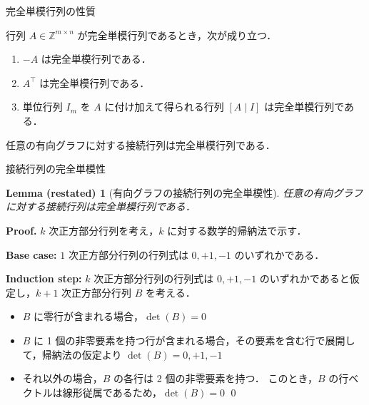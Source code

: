 \documentclass[aspectratio=169]{beamer}
\newtheorem*{lemma*}{Lemma (restated)}
\begin{document}
\begin{frame}{完全単模行列の性質}
	\begin{lemma}[完全単模行列の性質]
		行列 \(A \in \mathbb{Z}^{m \times n}\) が完全単模行列であるとき，次が成り立つ．
		\begin{enumerate}
			\item \alert{\(-A\) は完全単模行列}である．
			\item \alert{\(A^{\top}\) は完全単模行列}である．
			\item 単位行列 \(I_m\) を \(A\) に付け加えて得られる行列 \alert{\([A \mid I]\) は完全単模行列}である．
		\end{enumerate}
	\end{lemma}
	\begin{lemma}[有向グラフの接続行列の完全単模性]
		任意の有向グラフに対する\alert{接続行列は完全単模行列}である．
	\end{lemma}
\end{frame}

\begin{frame}{接続行列の完全単模性}
	\begin{lemma*}[有向グラフの接続行列の完全単模性]
		任意の\alert{有向グラフ}に対する\alert{接続行列は完全単模行列}である．
	\end{lemma*}

	\textbf{Proof.}
	\(k\) 次正方部分行列を考え，\(k\) に対する数学的帰納法で示す．

	\textbf{Base case: }
	\(1\) 次正方部分行列の行列式は \(0, +1, -1\) のいずれかである．

	\textbf{Induction step: }
	\alert{\(k\) 次正方部分行列の行列式は \(0, +1, -1\) のいずれかであると仮定}し，\(k + 1\) 次正方部分行列 \(B\) を考える．
	\begin{itemize}
		\item \(B\) に零行が含まれる場合，\(\det(B) = 0\)
		\item \(B\) に 1 個の非零要素を持つ行が含まれる場合，その要素を含む行で展開して，帰納法の仮定より \(\det(B) = 0, +1, -1\)
		\item それ以外の場合，\(B\) の各行は 2 個の非零要素を持つ．
		      このとき，\(B\) の行ベクトルは線形従属であるため，\(\det(B) = 0\) \qed
	\end{itemize}
\end{frame}
\end{document}
